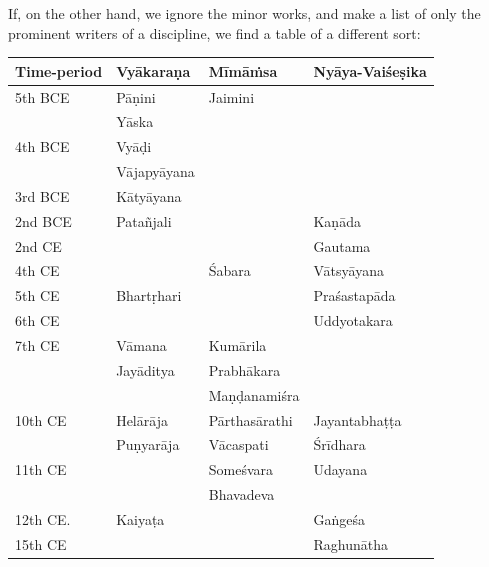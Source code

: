 If, on the other hand, we ignore the minor works, and make a list of only the prominent writers of a discipline, we find a table of a different sort: 
\begin{table}[H]
\centering
\tabcolsep=3pt
\renewcommand{\arraystretch}{1.2}
\begin{tabular}{|l|l|l|l|}
\hline
\textbf{Time-period} & \textbf{Vyākaraṇa}\index{Vyakarana@\textsl{Vyākaraṇa}} & \textbf{Mīmāṁsa}\index{Mimamsa@Mīmāṁsa} & \textbf{Nyāya-Vaiśeṣika}\index{Nyayavaisesika@Nyāya-Vaiśeṣika}\\\hline
5th BCE & Pāṇini\index{Panini@Pāṇini} & Jaimini\index{Jaimini}  & \\\hline
& Yāska\index{Yaska@Yāska} & & \\\hline
4th BCE & Vyāḍi\index{Vyadi@Vyāḍi} & & \\\hline
& Vājapyāyana\index{Vajapyayana@Vājapyāyana} & & \\\hline
3rd BCE & Kātyāyana\index{Katyayana@Kātyāyana} & & \\\hline
2nd BCE & Patañjali\index{Patanjali@Patañjali} & & Kaṇāda\index{Kanada@Kaṇāda}\\\hline
2nd CE & & & Gautama\index{Gautama}\\\hline
4th CE & & Śabara\index{Sabara@Śabara} & Vātsyāyana\index{Vatsyayana@Vātsyāyana}\\\hline
5th CE & Bhartṛhari\index{Bhartrhari@Bhartṛhari} & & Praśastapāda\index{Prasastapada@Praśastapāda}\\\hline
6th CE& & & Uddyotakara\\\hline
7th CE & Vāmana\index{Vamana@Vāmana} & Kumārila\index{Kumarilabhatta@Kumārilabhaṭṭa} & \\\hline
& Jayāditya\index{Jayaditya@Jayāditya} & Prabhākara\index{Prabhakara@Prabhākara} & \\\hline
& & Maṇḍanamiśra\index{Mandanamisra@Maṇḍanamiśra} & \\\hline
10th CE & Helārāja\index{Helaraja@Helārāja} & Pārthasārathi & Jayantabhaṭṭa\index{Jayantabhatta@Jayantabhaṭṭa}\\\hline
 & Puṇyarāja\index{Punyaraja@Puṇyarāja} & Vācaspati\index{Vacaspatimisra@Vācaspati Miśra} & Śrīdhara\\\hline
11th CE & & Someśvara & Udayana\index{Udayana}\\\hline
& & Bhavadeva & \\\hline
12th CE. & Kaiyaṭa\index{Kaiyata@Kaiyaṭa} & & Gaṅgeśa\index{Gangesa@Gaṅgeśa}\\\hline
15th CE & & & Raghunātha\\\hline

\end{tabular}
\end{table}
